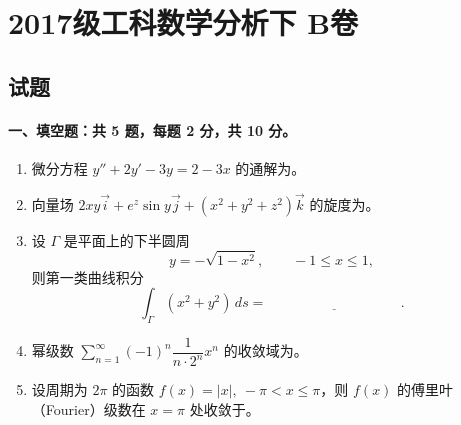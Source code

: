 \section{2017级工科数学分析下 B卷}

\subsection{试题}

\paragraph*{一、填空题：共 5 题，每题 2 分，共 10 分。}
\begin{enumerate}
  \item 微分方程 $y''+2y'-3y=2-3x$ 的通解为\underline{\hspace{4cm}}。
  \item 向量场 $2xy\vec{i}+e^z\sin y\vec{j}+(x^2+y^2+z^2)\vec{k}$ 的旋度为\underline{\hspace{4cm}}。
  \item 设 $\Gamma$ 是平面上的下半圆周
  \[
    y=-\sqrt{1-x^2},\qquad -1\le x\le 1,
  \]
  则第一类曲线积分
  \[
    \int_\Gamma (x^2+y^2)\,ds=\underline{\hspace{4cm}}.
  \]
  \item 幂级数 $\displaystyle \sum_{n=1}^{\infty}(-1)^n\dfrac{1}{n\cdot 2^n}x^n$ 的收敛域为\underline{\hspace{4cm}}。
  \item 设周期为 $2\pi$ 的函数 $f(x)=|x|,\ -\pi<x\le\pi$，则 $f(x)$ 的傅里叶（Fourier）级数在 $x=\pi$ 处收敛于\underline{\hspace{4cm}}。
\end{enumerate}

